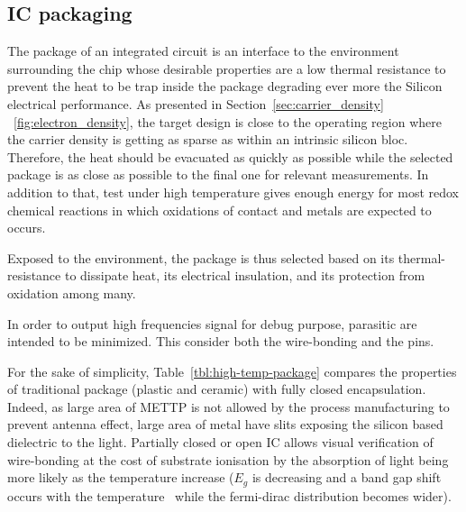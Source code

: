 \subsection{IC packaging}
The package of an integrated circuit is an interface to the environment surrounding the chip whose desirable properties are a low thermal resistance to prevent the heat to be trap inside the package degrading ever more the Silicon electrical performance. As presented in Section~\ref{sec:carrier_density} \figurename~\ref{fig:electron_density}, the target design is close to the operating region where the carrier density is getting as sparse as within an intrinsic silicon bloc.
Therefore, the heat should be evacuated as quickly as possible while the selected package is as close as possible to the final one for relevant measurements. In addition to that, test under high temperature gives enough energy for most redox chemical reactions in which oxidations of contact and metals are expected to occurs.

Exposed to the environment, the package is thus selected based on its thermal-resistance to dissipate heat, its electrical insulation, and its protection from oxidation among many.

In order to output high frequencies signal for debug purpose, parasitic are intended to be minimized. This consider both the wire-bonding and the pins.

For the sake of simplicity, Table~\ref{tbl:high-temp-package} compares the properties of traditional package (plastic and ceramic) with fully closed encapsulation. Indeed, as large area of METTP is not allowed by the process manufacturing to prevent antenna effect, large area of metal have slits exposing the silicon based dielectric to the light. Partially closed or open IC allows visual verification of wire-bonding at the cost of substrate ionisation by the absorption of light being more likely as the temperature increase (\(E_g\) is decreasing and a band gap shift occurs with the temperature~\cite{Lautenschlager1985,Klenner1992} while the fermi-dirac distribution becomes wider).

